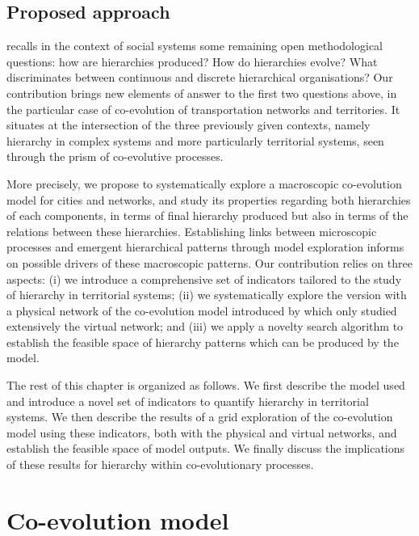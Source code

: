 \documentclass[11pt]{article}
\begin{document}
\subsection{Proposed approach}

\cite{pumain2006introduction} recalls in the context of social systems some remaining open methodological questions: how are hierarchies produced? How do hierarchies evolve? What discriminates between continuous and discrete hierarchical organisations? Our contribution brings new elements of answer to the first two questions above, in the particular case of co-evolution of transportation networks and territories. It situates at the intersection of the three previously given contexts, namely hierarchy in complex systems and more particularly territorial systems, seen through the prism of co-evolutive processes.

More precisely, we propose to systematically explore a macroscopic co-evolution model for cities and networks, and study its properties regarding both hierarchies of each components, in terms of final hierarchy produced but also in terms of the relations between these hierarchies. Establishing links between microscopic processes and emergent hierarchical patterns through model exploration informs on possible drivers of these macroscopic patterns. Our contribution relies on three aspects: (i) we introduce a comprehensive set of indicators tailored to the study of hierarchy in territorial systems; (ii) we systematically explore the version with a physical network of the co-evolution model introduced by \cite{raimbault2018modeling} which only studied extensively the virtual network; and (iii) we apply a novelty search algorithm to establish the feasible space of hierarchy patterns which can be produced by the model.

The rest of this chapter is organized as follows. We first describe the model used and introduce a novel set of indicators to quantify hierarchy in territorial systems. We then describe the results of a grid exploration of the co-evolution model using these indicators, both with the physical and virtual networks, and establish the feasible space of model outputs. We finally discuss the implications of these results for hierarchy within co-evolutionary processes.


\section{Co-evolution model}
\end{document}
